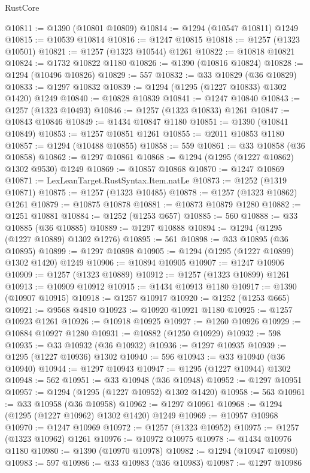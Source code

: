 \begin{lexlean}{RustCore}
\begin{coremodule}
@10811 := @1390 (@10801 @10809)
@10814 := @1294 (@10547 @10811) @1249
@10815 := @10539 @10814
@10816 := @1247 @10815
@10818 := @1257 (@1323 @10501)
@10821 := @1257 (@1323 @10544) @1261
@10822 := @10818 @10821
@10824 := @1732 @10822 @1180
@10826 := @1390 (@10816 @10824)
@10828 := @1294 (@10496 @10826)
@10829 := 557
@10832 := @33 @10829 (@36 @10829)
@10833 := @1297 @10832
@10839 := @1294 (@1295 (@1227 @10833) @1302 @1420) @1249
@10840 := @10828 @10839
@10841 := @1247 @10840
@10843 := @1257 (@1323 @10493)
@10846 := @1257 (@1323 @10833) @1261
@10847 := @10843 @10846
@10849 := @1434 @10847 @1180
@10851 := @1390 (@10841 @10849)
@10853 := @1257 @10851 @1261
@10855 := @2011 @10853 @1180
@10857 := @1294 (@10488 @10855)
@10858 := 559
@10861 := @33 @10858 (@36 @10858)
@10862 := @1297 @10861
@10868 := @1294 (@1295 (@1227 @10862) @1302 @9530) @1249
@10869 := @10857 @10868
@10870 := @1247 @10869
@10871 := LexLeanTarget.RustSyntax.Item.natLe
@10873 := @1252 (@1319 @10871)
@10875 := @1257 (@1323 @10485)
@10878 := @1257 (@1323 @10862) @1261
@10879 := @10875 @10878
@10881 := @10873 @10879 @1280
@10882 := @1251 @10881
@10884 := @1252 (@1253 @657)
@10885 := 560
@10888 := @33 @10885 (@36 @10885)
@10889 := @1297 @10888
@10894 := @1294 (@1295 (@1227 @10889) @1302 @1276)
@10895 := 561
@10898 := @33 @10895 (@36 @10895)
@10899 := @1297 @10898
@10905 := @1294 (@1295 (@1227 @10899) @1302 @1420) @1249
@10906 := @10894 @10905
@10907 := @1247 @10906
@10909 := @1257 (@1323 @10889)
@10912 := @1257 (@1323 @10899) @1261
@10913 := @10909 @10912
@10915 := @1434 @10913 @1180
@10917 := @1390 (@10907 @10915)
@10918 := @1257 @10917
@10920 := @1252 (@1253 @665)
@10921 := @9568 @4810
@10923 := @10920 @10921 @1180
@10925 := @1257 @10923 @1261
@10926 := @10918 @10925
@10927 := @1260 @10926
@10929 := @10884 @10927 @1280
@10931 := @10882 (@1250 @10929)
@10932 := 598
@10935 := @33 @10932 (@36 @10932)
@10936 := @1297 @10935
@10939 := @1295 (@1227 @10936) @1302
@10940 := 596
@10943 := @33 @10940 (@36 @10940)
@10944 := @1297 @10943
@10947 := @1295 (@1227 @10944) @1302
@10948 := 562
@10951 := @33 @10948 (@36 @10948)
@10952 := @1297 @10951
@10957 := @1294 (@1295 (@1227 @10952) @1302 @1420)
@10958 := 563
@10961 := @33 @10958 (@36 @10958)
@10962 := @1297 @10961
@10968 := @1294 (@1295 (@1227 @10962) @1302 @1420) @1249
@10969 := @10957 @10968
@10970 := @1247 @10969
@10972 := @1257 (@1323 @10952)
@10975 := @1257 (@1323 @10962) @1261
@10976 := @10972 @10975
@10978 := @1434 @10976 @1180
@10980 := @1390 (@10970 @10978)
@10982 := @1294 (@10947 @10980)
@10983 := 597
@10986 := @33 @10983 (@36 @10983)
@10987 := @1297 @10986

\end{coremodule}
\end{lexlean}
